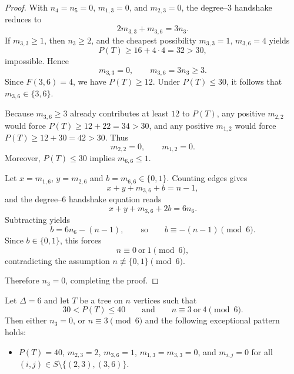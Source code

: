 \documentclass[preprint,12pt]{elsarticle}
\begin{document}
\begin{proof}
With $n_4=n_5=0$, $m_{1,3}=0$, and $m_{2,3}=0$, the degree--$3$ handshake reduces to
\[
2m_{3,3}+m_{3,6}=3n_3.
\]
If $m_{3,3}\ge 1$, then $n_3\ge 2$, and the cheapest possibility
$m_{3,3}=1$, $m_{3,6}=4$ yields
\[
P(T)\ge 16+4\cdot 4=32>30,
\]
impossible.
Hence
\[
m_{3,3}=0,
\qquad
m_{3,6}=3n_3\ge 3.
\]
Since $F(3,6)=4$, we have $P(T)\ge 12$.
Under $P(T)\le 30$, it follows that $m_{3,6}\in\{3,6\}$.

Because $m_{3,6}\ge 3$ already contributes at least $12$ to $P(T)$, any positive
$m_{2,2}$ would force $P(T)\ge 12+22= 34>30$, and any positive $m_{1,2}$ would force
$P(T)\ge 12+30= 42>30$.
Thus
\[
m_{2,2}=0,
\qquad
m_{1,2}=0.
\]
Moreover, $P(T)\le 30$ implies $m_{6,6}\le 1$.

Let $x=m_{1,6}$, $y=m_{2,6}$ and $b=m_{6,6}\in\{0,1\}$.
Counting edges gives
\[
x+y+m_{3,6}+b=n-1,
\]
and the degree--$6$ handshake equation reads
\[
x+y+m_{3,6}+2b=6n_6.
\]
Subtracting yields
\[
b=6n_6-(n-1),
\qquad\text{so}\qquad
b\equiv -(n-1)\pmod 6.
\]
Since $b\in\{0,1\}$, this forces
\[
n\equiv 0 \ \text{or}\ 1\pmod 6,
\]
contradicting the assumption $n\not\equiv \{0,1\}\pmod 6$.

Therefore $n_3=0$, completing the proof.
\end{proof}


\begin{lemma}
\label{lem:no3-30-40-final-v5}
Let $\Delta=6$ and let $T$ be a tree on $n$ vertices such that
\[
30<P(T)\le 40
\qquad\text{and}\qquad
n\equiv 3 \ \text{or}\ 4\pmod 6.
\]
Then either $n_3=0$, or $n\equiv 3\pmod 6$ and the following exceptional pattern holds:
\begin{itemize}
\item[\textup{(E1)}] $P(T)=40$, $m_{2,3}=2$, $m_{3,6}=1$, $m_{1,3}=m_{3,3}=0$,
and $m_{i,j}=0$ for all $(i,j)\in S\setminus\{(2,3),(3,6)\}$.
\end{itemize}
\end{lemma}
\end{document}
